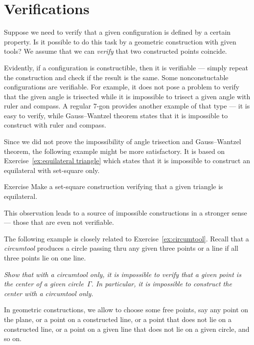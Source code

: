 \section*{Verifications}

Suppose we need to verify that a given configuration is defined by a certain property. 
Is it possible to do this task by a geometric construction with given tools?
We assume that we can \emph{verify} that two constructed points coincide.

Evidently, if a configuration is constructible, then it is verifiable --- simply repeat the construction and check if the result is the same.
Some nonconstuctable configurations are verifiable.
For example, it does not pose a problem to verify that the given angle is trisected while it is impossible to trisect a given angle with ruler and compass.
A regular 7-gon provides another example of that type --- it is easy to verify, while Gauss--Wantzel theorem states that it is impossible to construct with ruler and compass.

Since we did not prove the impossibility of angle trisection and Gauss--Wantzel theorem, the following example might be more satisfactory.
It is based on Exercise~\ref{ex:equilateral triangle} which states that it is impossible to construct an equilateral with set-square only.

\begin{thm}{Exercise}\label{ex:equilateral triangle-verify}
Make a set-square construction verifying that a given triangle is equilateral.
\end{thm}

This observation leads to a source of impossible constructions in a stronger sense --- those that are even not verifiable.

The following example is closely related to Exercise~\ref{ex:circumtool}.
Recall that a \emph{circumtool} produces a circle passing thru any given three points
or a line if all three points lie on one line.


\textit{Show that with a circumtool only,
it is impossible to verify that a given point is the center of a given circle~$\Gamma$. In particular, it is impossible to construct the center with a circumtool only.}
\medskip

In geometric constructions, we allow to choose some free points,
say any point on the plane, or a point on a constructed line, or a point that does not lie on a constructed line, 
or a point on a given line that does not lie on a given circle, and so on.

